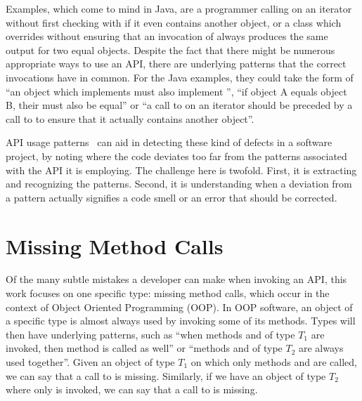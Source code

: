 Examples, which come to mind in Java, are a programmer calling  on an iterator without first checking with  if it even contains another object, or a class which overrides  without ensuring that an invocation of  always produces the same output for two equal objects.
Despite the fact that there might be numerous appropriate ways to use an API, there are underlying patterns that the correct invocations have in common.
For the Java examples, they could take the form of ``an object which implements  must also implement '', ``if object A equals object B, their  must also be equal'' or ``a call to  on an iterator should be preceded by a call to  to ensure that it actually contains another object''.

API usage patterns~\cite{robillard2013automated} can aid in detecting these kind of defects in a software project, by noting where the code deviates too far from the patterns associated with the API it is employing.
The challenge here is twofold.
First, it is extracting and recognizing the patterns.
Second, it is understanding when a deviation from a pattern actually signifies a code smell or an error that should be corrected.

\section{Missing Method Calls}

Of the many subtle mistakes a developer can make when invoking an API, this work focuses on one specific type: missing method calls, which occur in the context of Object Oriented Programming (OOP).
In OOP software, an object of a specific type is almost always used by invoking some of its methods.
Types will then have underlying patterns, such as ``when methods  and  of type $T_1$ are invoked, then method  is called as well'' or ``methods  and  of type $T_2$ are always used together''.
Given an object of type $T_1$ on which only methods  and  are called, we can say that a call to  is missing.
Similarly, if we have an object of type $T_2$ where only  is invoked, we can say that a call to  is missing.

